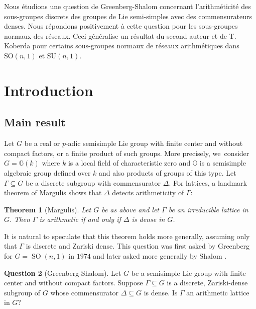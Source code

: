 \documentclass[JEP,XML,SOM,Unicode,published]{cedram}
\newcommand{\G}{\ensuremath{\mathbb{G}}}
\DeclareMathOperator{\SO}{SO}
\newtheorem{thm}{Theorem}[section]
\theoremstyle{definition}
\newtheorem{question}[thm]{Question}
\begin{document}

\begin{altabstract}
Nous étudions une question de Greenberg-Shalom concernant l'arithméticité des sous-groupes discrets des groupes de Lie semi-simples avec des commensurateurs denses. Nous répondons positivement à cette question pour les sous-groupes normaux des réseaux. Ceci généralise un résultat du second auteur et de T.\,Koberda pour certains sous-groupes normaux de réseaux arithmétiques dans $\mathrm{SO}(n,1)$ et $\mathrm{SU}(n,1)$.
\end{altabstract}

\maketitle
\vspace*{-\baselineskip}
\tableofcontents
\mainmatter

\section{Introduction}
\label{sec:intro}

\subsection{Main result}\label{sec:mainthm} Let $G$ be a real or $p$-adic semisimple Lie group with finite center and without compact factors, or a finite product of such groups. More precisely, we~consider $G=\G(k)$ where $k$ is a local field of characteristic zero and $\G$ is a semisimple algebraic group defined over $k$ and also products of groups of this type. Let $\Gamma\subseteq G$ be a discrete subgroup with commensurator $\Delta$. For lattices, a landmark theorem of Margulis shows that $\Delta$ detects arithmeticity of $\Gamma$:
\begin{thm}[Margulis]\label{thm:margulis-comm}
Let $G$ be as above and let $\Gamma$ be an irreducible lattice in~$G$. Then $\Gamma$ is arithmetic if and only if $\Delta$ is dense in $G$.
\end{thm}
It is natural to speculate that this theorem holds more generally, assuming only that $\Gamma$ is discrete and Zariski dense. This question was first asked by Greenberg for $G=\SO(n,1)$ in $1974$ and later asked more generally by Shalom \cite{greenberg-comm, mj-comm}.

\begin{question}[{Greenberg-Shalom}]\label{q:shalom}
Let $G$ be a semisimple Lie group with finite center and without compact factors. Suppose $\Gamma\subseteq G$ is a discrete, Zariski-dense subgroup of $G$ whose commensurator $\Delta\subseteq G$ is dense. Is $\Gamma$ an arithmetic lattice in $G$?
\end{question}
\end{document}
